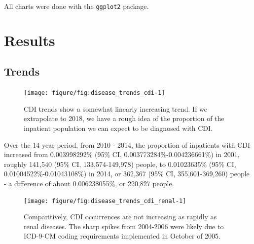\documentclass[12pt]{ociamthesis}\usepackage[]{graphicx}\usepackage[]{color}
\newenvironment{knitrout}{}{} %
\newcommand{\ci}[3]{#1 (95\% CI, #2-#3)}
\newcommand{\cip}[3]{#1\% (95\% CI, #2\%-#3\%)}
\begin{document}
All charts were done with the \texttt{ggplot2} package. 

\chapter{Results}


\section{Trends}

\begin{knitrout}
\color{fgcolor}\begin{figure}

{\centering \texttt{[image: figure/fig:disease\_trends\_cdi-1]} 

}

\caption[CDI trends show a somewhat linearly increasing trend]{CDI trends show a somewhat linearly increasing trend. If we extrapolate to 2018, we have a rough idea of the proportion of the inpatient population we can expect to be diagnosed with CDI.}\label{fig:fig:disease_trends_cdi}
\end{figure}


\end{knitrout}
\label{fig:disease_trends_cdi}

Over the 14 year period, from 2010 - 2014, the proportion of inpatients with CDI increased from 
\cip{0.003998292}{0.003773284}{0.004236661} in 2001, roughly 
\ci{141,540}{133,574}{149,978} people, to
\cip{0.01023635}{0.01004522}{0.01043108} in 2014, or
\ci{362,367}{355,601}{369,260} people - 
a difference of about 0.006238055\%, or 220,827 people. 



\begin{knitrout}
\color{fgcolor}\begin{figure}

{\centering \texttt{[image: figure/fig:disease\_trends\_cdi\_renal-1]} 

}

\caption[Comparitively, CDI occurrences are not increasing as rapidly as renal diseases]{Comparitively, CDI occurrences are not increasing as rapidly as renal diseases. The sharp spikes from 2004-2006 were likely due to ICD-9-CM coding requirements implemented in October of 2005.}\label{fig:fig:disease_trends_cdi_renal}
\end{figure}


\end{knitrout}
\label{fig:disease_trends_cdi_renal}
\end{document}
